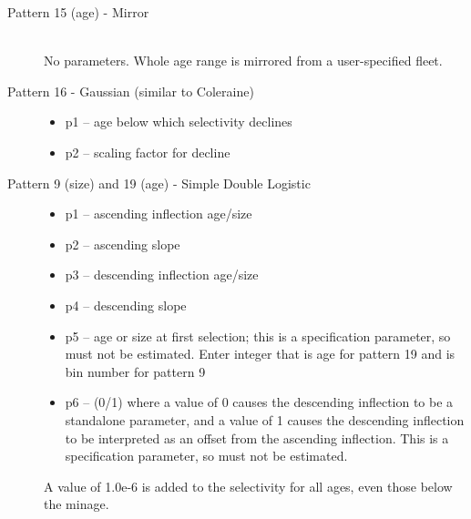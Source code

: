 \begin{description}
	\item[Pattern 15 (age) - Mirror]\hfil\\
	No parameters.  Whole age range is mirrored from a user-specified fleet.
\end{description}

\begin{description}
	\item[Pattern 16 - Gaussian (similar to Coleraine)]\hfil
	\begin{itemize}
		\item p1 – age below which selectivity declines
		\item p2 – scaling factor for decline
	\end{itemize}
\end{description}

\begin{description}
	\item[Pattern 9 (size) and 19 (age) - Simple Double Logistic]\hfil
	\begin{itemize}
		\item p1 – ascending inflection age/size
		\item p2 – ascending slope
		\item p3 – descending inflection age/size
		\item p4 – descending slope
		\item p5 – age or size at first selection; this is a specification parameter, so must not be estimated.  Enter integer that is age for pattern 19 and is bin number for pattern 9
		\item p6 – (0/1)  where a value of 0 causes the descending inflection to be a standalone parameter, and a value of 1 causes the descending inflection to be interpreted as an offset from the ascending inflection.  This is a specification parameter, so must not be estimated.
	\end{itemize}
	A value of 1.0e-6 is added to the selectivity for all ages, even those below the minage.\\
\end{description}

